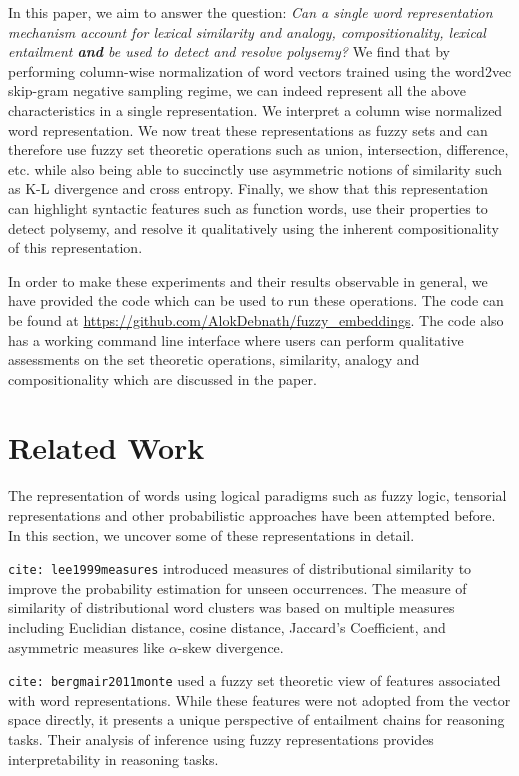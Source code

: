 \documentclass[11pt]{book}
\newcommand{\citet}[1]{\texttt{cite: #1}}
\begin{document}
In this paper, we aim to answer the question: \textit{Can a single word
representation mechanism account for lexical similarity and analogy,
compositionality, lexical entailment \textbf{and} be used to detect and resolve
polysemy?} We find that by performing column-wise normalization of word vectors
trained using the word2vec skip-gram negative sampling regime, we can indeed
represent all the above characteristics in a single representation. We
interpret a column wise normalized word representation. We now treat these
representations as fuzzy sets and can therefore use fuzzy set theoretic
operations such as union, intersection, difference, etc. while also being able
to succinctly use asymmetric notions of similarity such as K-L divergence and
cross entropy. Finally, we show that this representation can highlight
syntactic features such as function words, use their properties to detect
polysemy, and resolve it qualitatively using the inherent compositionality of
this representation.

In order to make these experiments and their results observable in general, we
have provided the code which can be used to run these operations. The code can
be found at \url{https://github.com/AlokDebnath/fuzzy_embeddings}. The code
also has a working command line interface where users can perform qualitative
assessments on the set theoretic operations, similarity, analogy and
compositionality which are discussed in the paper.

\section{Related Work} \label{sec: related}

The representation of words using logical paradigms such as fuzzy logic,
tensorial representations and other probabilistic approaches have been
attempted before. In this section, we uncover some of these representations in
detail. 

\citet{lee1999measures} introduced measures of distributional similarity to
improve the probability estimation for unseen occurrences. The measure of
similarity of distributional word clusters was based on multiple measures
including Euclidian distance, cosine distance, Jaccard's Coefficient, and
asymmetric measures like $\alpha$-skew divergence.

\citet{bergmair2011monte} used a fuzzy set theoretic view of features
associated with word representations. While these features were not adopted
from the vector space directly, it presents a unique perspective of entailment
chains for reasoning tasks. Their analysis of inference using fuzzy
representations provides interpretability in reasoning tasks.
\end{document}
